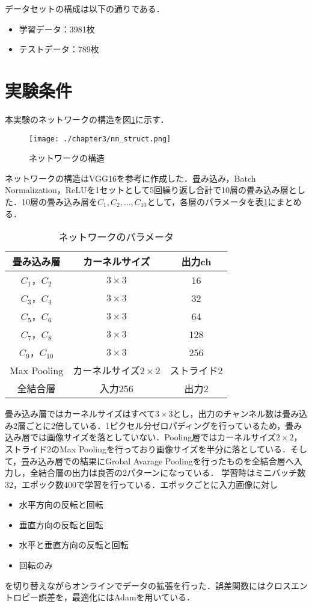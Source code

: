 データセットの構成は以下の通りである．
\begin{itemize}
  \item 学習データ：3981枚
  \item テストデータ：789枚
\end{itemize}

\section{実験条件}
本実験のネットワークの構造を図\ref{fig_nnst}に示す．
\begin{figure}[htbp]
  \begin{center}
    \texttt{[image: ./chapter3/nn\_struct.png]}
    \caption{ネットワークの構造}
    \label{fig_nnst}
  \end{center}
\end{figure}

ネットワークの構造はVGG16\cite{simonyan2015deep}を参考に作成した．畳み込み，Batch Normalization，ReLUを1セットとして5回繰り返し合計で10層の畳み込み層とした．10層の畳み込み層を$C_1, C_2,  \ldots , C_{10}$として，各層のパラメータを表\ref{table_network_parameter}にまとめる．
\begin{table}
  \caption{ネットワークのパラメータ}
  \label{table_network_parameter}
  \centering
  \begin{tabular}{ccc}
    \hline
    畳み込み層  & カーネルサイズ & 出力ch \\
    \hline \hline
    $C_1$，$C_2$ & $3\times 3$ & 16\\
    $C_3$，$C_4$ & $3\times 3$ & 32\\
    $C_5$，$C_6$ & $3\times 3$ & 64\\
    $C_7$，$C_8$ & $3\times 3$ & 128\\
    $C_9$，$C_{10}$ & $3\times 3$ & 256\\
    \hline
    Max Pooling & カーネルサイズ$2\times 2$ & ストライド2\\
    全結合層 & 入力256 & 出力2\\
    \hline
  \end{tabular}
\end{table}
畳み込み層ではカーネルサイズはすべて$3\times 3$とし，出力のチャンネル数は畳み込み2層ごとに2倍している．1ピクセル分ゼロパディングを行っているため，畳み込み層では画像サイズを落としていない．Pooling層ではカーネルサイズ$2\times 2$，ストライド2のMax Poolingを行っており画像サイズを半分に落としている．そして，畳み込み層での結果にGrobal Avarage Poolingを行ったものを全結合層へ入力し，全結合層の出力は良否の2パターンになっている．
学習時はミニバッチ数32，エポック数400で学習を行っている．エポックごとに入力画像に対し
\begin{itemize}
  \item 水平方向の反転と回転
  \item 垂直方向の反転と回転
  \item 水平と垂直方向の反転と回転
  \item 回転のみ
\end{itemize}
を切り替えながらオンラインでデータの拡張を行った．誤差関数にはクロスエントロピー誤差を，最適化にはAdamを用いている．

